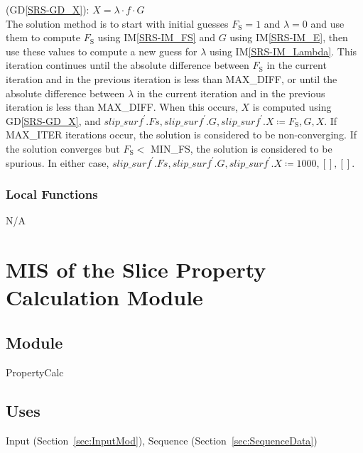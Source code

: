 \documentclass[12pt, titlepage]{article}
\newcommand{\iref}[1]{IM\ref{#1}}
\newcommand{\dref}[1]{GD\ref{#1}}
\begin{document}
\begin{itemize}
\begin{itemize}
		(\dref{SRS-GD_X}): \( X = \lambda \cdot f \cdot G \) \\
		
		The solution method is to start with initial guesses $F_\text{S} = 1$ 
		and $\lambda = 0$ and use them to compute $F_\text{S}$ using 
		\iref{SRS-IM_FS} and $G$ using \iref{SRS-IM_E}, then use these values 
		to compute a new guess for $\lambda$ using \iref{SRS-IM_Lambda}. This 
		iteration continues until the absolute difference between $F_\text{S}$ 
		in the current iteration and in the previous iteration is less than 
		MAX\_DIFF, or until the absolute difference between $\lambda$ in the 
		current iteration and in the previous iteration is less than MAX\_DIFF. 
		When this occurs, $X$ is computed using \dref{SRS-GD_X}, and 
		$\textit{slip\_surf}^\prime.Fs, \textit{slip\_surf}^\prime.G, 
		\textit{slip\_surf}^\prime.X \coloneqq F_\text{S}, G, X$.
		If MAX\_ITER iterations occur, the solution is considered to be 
		non-converging. If the solution converges but $F_\text{S} <$ 
		MIN\_FS, the solution is considered to be spurious. In either case, 
		$\textit{slip\_surf}^\prime.Fs, \textit{slip\_surf}^\prime.G, 
		\textit{slip\_surf}^\prime.X \coloneqq 1000, [], []$.
	\end{itemize}
\end{itemize}


\subsubsection{Local Functions}
N/A

\newpage
\section{MIS of the Slice Property Calculation Module} \label{sec:PropSortMod}

\subsection{Module} 
PropertyCalc

\subsection{Uses}
Input (Section~\ref{sec:InputMod}), Sequence (Section~\ref{sec:SequenceData})
\end{document}
